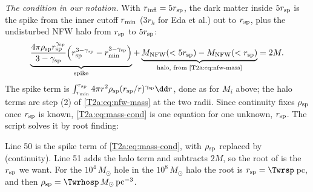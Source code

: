 \emph{The condition in our notation.} With $r_{\rm infl}=5r_{\rm sp}$, the dark matter inside $5r_{\rm sp}$ is the spike from the inner cutoff $r_{\rm min}$ ($3r_h$ for Eda et al.) out to $r_{\rm sp}$, plus the undisturbed NFW halo from $r_{\rm sp}$ to $5r_{\rm sp}$:
\begin{equation}
  \underbrace{\frac{4\pi\rho_{\rm sp}r_{\rm sp}^{\gamma_{\rm sp}}}{3-\gamma_{\rm sp}}\Big(r_{\rm sp}^{3-\gamma_{\rm sp}}-r_{\rm min}^{3-\gamma_{\rm sp}}\Big)}_{\text{spike}}
  +\underbrace{M_{\rm NFW}(<5r_{\rm sp})-M_{\rm NFW}(<r_{\rm sp})}_{\text{halo, from \eqref{T2a:eq:nfw-mass}}}=2M .
  \label{T2a:eq:mass-cond}
\end{equation}
The spike term is $\int_{r_{\rm min}}^{r_{\rm sp}}4\pi r^2\rho_{\rm sp}(r_{\rm sp}/r)^{\gamma_{\rm sp}}\dd r$, done as for $M_i$ above; the halo terms are step (2) of \eqref{T2a:eq:nfw-mass} at the two radii. Since continuity fixes $\rho_{\rm sp}$ once $r_{\rm sp}$ is known, \eqref{T2a:eq:mass-cond} is one equation for one unknown, $r_{\rm sp}$. The script  solves it by root finding:


\noindent Line 50 is the spike term of \eqref{T2a:eq:mass-cond}, with $\rho_{\rm sp}$ replaced by  (continuity). Line 51 adds the halo term and subtracts $2M$, so the root of  is the $r_{\rm sp}$ we want. For the $10^4\,M_\odot$ hole in the $10^8\,M_\odot$ halo the root is $r_{\rm sp}=\Twrsp$\,pc, and then $\rho_{\rm sp}=\Twrhosp\,M_\odot\,{\rm pc}^{-3}$.


